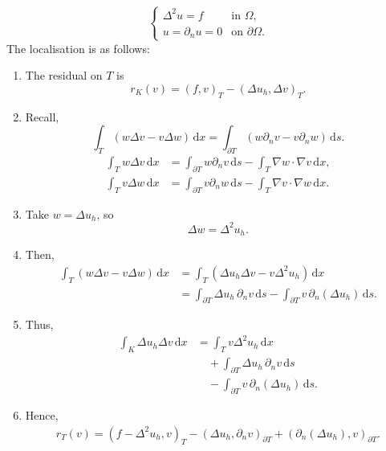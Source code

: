 \documentclass[12pt,a4paper]{article}
\begin{document}
\[
\begin{cases}
\Delta^2 u=f & \text{in }\Omega,\\
u=\partial_n u=0 & \text{on }\partial\Omega.
\end{cases}
\]
The localisation is as follows:
\begin{enumerate}[label=\roman*),leftmargin=2.1em,itemsep=1em]
  \item The residual on $T$ is
  \[
  r_K(v)=(f,v)_T-(\Delta u_h,\Delta v)_T.
  \]

  \item Recall,
  \[
  \int_T (w\Delta v-v\Delta w)\,\mathrm{d}x
  =\int_{\partial T}(w\partial_n v-v\partial_n w)\,\mathrm{d}s.
  \]
  \[
  \begin{aligned}
  \int_Tw\Delta v\,\mathrm{d}x
    &=\int_{\partial T}w\partial_n v\,\mathrm{d}s
      -\int_T\nabla w\cdot\nabla v\,\mathrm{d}x,\\[0.5em]
  \int_Tv\Delta w\,\mathrm{d}x
    &=\int_{\partial T}v\partial_n w\,\mathrm{d}s
      -\int_T\nabla v\cdot\nabla w\,\mathrm{d}x.
  \end{aligned}
  \]

  \item Take $w=\Delta u_h$, so
  \[
  \Delta w=\Delta^2u_h.
  \]

  \item Then,
  \[
  \begin{aligned}
  \int_T (w\Delta v-v\Delta w)\,\mathrm{d}x
    &=\int_T(\Delta u_h\Delta v-v\Delta^2u_h)\,\mathrm{d}x\\
    &=\int_{\partial T}\Delta u_h\,\partial_n v\,\mathrm{d}s
      -\int_{\partial T}v\,\partial_n(\Delta u_h)\,\mathrm{d}s.
  \end{aligned}
  \]

  \item Thus,
  \[
  \begin{aligned}
  \int_K\Delta u_h\Delta v\,\mathrm{d}x
    &=\int_Tv\Delta^2u_h\,\mathrm{d}x\\
    &\quad+\int_{\partial T}\Delta u_h\,\partial_n v\,\mathrm{d}s\\
    &\quad-\int_{\partial T}v\,\partial_n(\Delta u_h)\,\mathrm{d}s.
  \end{aligned}
  \]

  \item Hence,
\begin{align}
  r_T(v)
    =(f-\Delta^2u_h,v)_T
    -(\Delta u_h,\partial_n v)_{\partial T}
    +(\partial_n(\Delta u_h),v)_{\partial T}.
  \end{align}
\end{enumerate}
\end{document}
